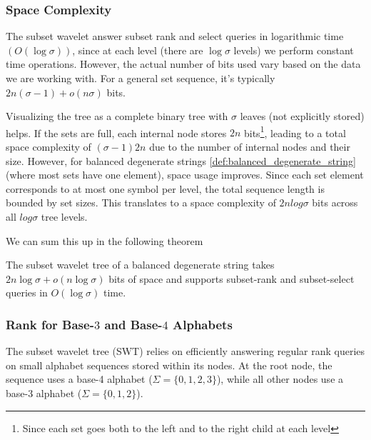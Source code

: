 \subsubsection*{Space Complexity}
The subset wavelet answer subset rank and select queries in logarithmic time $(O(\log \sigma))$, since at each level (there are $\log \sigma$ levels) we perform constant time operations. However, the actual number of bits used vary based on the data we are working with. For a general set sequence, it's typically $2n(\sigma - 1) + o(n\sigma)$ bits. \vspace{0.4cm}

\noindent Visualizing the tree as a complete binary tree with $\sigma$ leaves (not explicitly stored) helps. If the sets are full, each internal node stores $2n$ bits\footnote{Since each set goes both to the left and to the right child at each level}, leading to a total space complexity of $(\sigma - 1)2n$ due to the number of internal nodes and their size. However, for balanced degenerate strings \ref{def:balanced_degenerate_string} (where most sets have one element), space usage improves. Since each set element corresponds to at most one symbol per level, the total sequence length is bounded by set sizes. This translates to a space complexity of $2n log \sigma$ bits across all $log \sigma$ tree levels. \vspace{0.4cm}

\noindent We can sum this up in the following theorem

\begin{theorem} \label{thm:swt_space}
    The subset wavelet tree of a balanced degenerate string takes $2n \log \sigma + o(n \log \sigma)$ bits of space and supports subset-rank and subset-select queries in $O(\log \sigma)$ time.
\end{theorem}


\subsubsection*{Rank for Base-$3$ and Base-$4$ Alphabets}

The subset wavelet tree (SWT) relies on efficiently answering regular rank queries on small alphabet sequences stored within its nodes. At the root node, the sequence uses a base-4 alphabet ($\Sigma = \{0, 1, 2, 3\}$), while all other nodes use a base-3 alphabet ($\Sigma = \{0, 1, 2\}$). \vspace{0.4cm}

